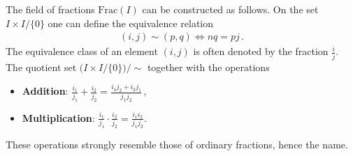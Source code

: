     \begin{construct}
        The field of fractions $\mathrm{Frac}(I)$ can be constructed as follows. On the set $I\times I/\{0\}$ one can define the equivalence relation
        \begin{gather}
            (i,j)\sim(p,q)\iff nq=pj\,.
        \end{gather}
        The equivalence class of an element $(i,j)$ is often denoted by the fraction $\frac{i}{j}$. The quotient set $\big(I\times I/\{0\}\big)/\sim$ together with the operations
        \begin{itemize}
            \item\textbf{Addition}: $\displaystyle\frac{i_1}{j_1} + \frac{i_2}{j_2} = \frac{i_1j_2 + i_2j_1}{j_1j_2}$\,,
            \item\textbf{Multiplication}: $\displaystyle\frac{i_1}{j_1}\cdot\frac{i_2}{j_2} = \frac{i_1i_2}{j_1j_2}$.
        \end{itemize}
        These operations strongly resemble those of ordinary fractions, hence the name.
    \end{construct}


